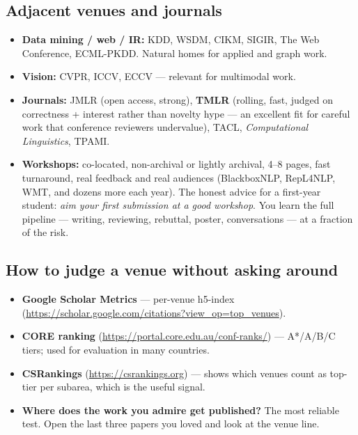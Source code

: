 \documentclass[11pt,a4paper]{article}
\begin{document}
\subsection{Adjacent venues and journals}

\begin{itemize}
  \item \textbf{Data mining / web / IR:} KDD, WSDM, CIKM, SIGIR, The Web
        Conference, ECML-PKDD. Natural homes for applied and graph work.
  \item \textbf{Vision:} CVPR, ICCV, ECCV --- relevant for multimodal work.
  \item \textbf{Journals:} JMLR (open access, strong), \textbf{TMLR}
        (rolling, fast, judged on correctness + interest rather than
        novelty hype --- an excellent fit for careful work that conference
        reviewers undervalue), TACL, \emph{Computational Linguistics}, TPAMI.
  \item \textbf{Workshops:} co-located, non-archival or lightly archival,
        4--8 pages, fast turnaround, real feedback and real audiences
        (BlackboxNLP, RepL4NLP, WMT, and dozens more each year). The honest
        advice for a first-year student: \emph{aim your first submission at a
        good workshop}. You learn the full pipeline --- writing, reviewing,
        rebuttal, poster, conversations --- at a fraction of the risk.
\end{itemize}

\subsection{How to judge a venue without asking around}

\begin{itemize}
  \item \textbf{Google Scholar Metrics} --- per-venue h5-index
        (\url{https://scholar.google.com/citations?view_op=top_venues}).
  \item \textbf{CORE ranking} (\url{https://portal.core.edu.au/conf-ranks/})
        --- A*/A/B/C tiers; used for evaluation in many countries.
  \item \textbf{CSRankings} (\url{https://csrankings.org}) --- shows which
        venues count as top-tier per subarea, which is the useful signal.
  \item \textbf{Where does the work you admire get published?} The most
        reliable test. Open the last three papers you loved and look at the
        venue line.
\end{itemize}
\end{document}
